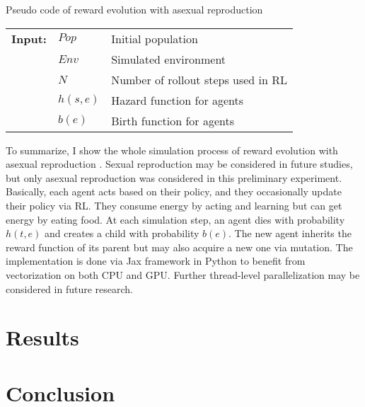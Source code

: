 \begin{algorithm}
  \caption{Pseudo code of reward evolution with asexual reproduction}\label{alg:reward-evo}
  \begin{tabular}{lll}
    \textbf{Input:} & $Pop$ & Initial population \\
                    & $Env$ & Simulated environment \\
                    & $N$ & Number of rollout steps used in RL \\
                    & $h(s, e)$ & Hazard function for agents \\
                    & $b(e)$ & Birth function for agents \\
  \end{tabular}
  \begin{algorithmic}[1]
    \Loop{}
      \EndOnce{}
    \EndFor{}

      \EndWith{}
      \EndWith{}
    \EndFor{}
  \EndLoop{}
\end{algorithmic}
\end{algorithm}

To summarize, I show the whole simulation process of reward evolution with asexual reproduction . Sexual reproduction may be considered in future studies, but only asexual reproduction was considered in this preliminary experiment. Basically, each agent acts based on their policy, and they occasionally update their policy via RL. They consume energy by acting and learning but can get energy by eating food. At each simulation step, an agent dies with probability $h(t, e)$ and creates a child with probability $b(e)$. The new agent inherits the reward function of its parent but may also acquire a new one via mutation. The implementation is done via Jax framework\citep{jax2018github} in Python to benefit from vectorization on both CPU and GPU. Further thread-level parallelization may be considered in future research.


\section{Results}

\section{Conclusion}